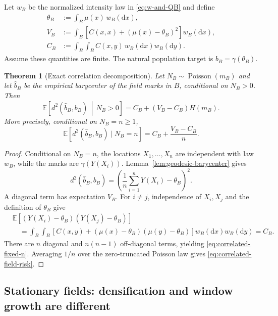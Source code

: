 \documentclass[11pt,a4paper]{article}
\newtheorem{theorem}{Theorem}[section]
\theoremstyle{remark}
\newcommand{\EE}{\mathbb E}
\begin{document}
Let \(w_B\) be the normalized intensity law in \eqref{eq:w-and-QB} and define
\begin{align}
\label{eq:theta-field}
 \theta_B&:=\int_B\mu(x)\,w_B(\mathrm dx),\\
\label{eq:VB}
 V_B&:=\int_B\left[C(x,x)+(\mu(x)-\theta_B)^2\right]w_B(\mathrm dx),\\
\label{eq:CB}
 C_B&:=\int_B\int_B C(x,y)\,w_B(\mathrm dx)w_B(\mathrm dy).
\end{align}
Assume these quantities are finite.  The natural population target is \(b_B=\gamma(\theta_B)\).

\begin{theorem}[Exact correlation decomposition]
\label{thm:correlated-field}
Let \(N_B\sim\operatorname{Poisson}(m_B)\) and let \(\widehat b_B\) be the empirical barycenter of the field marks in \(B\), conditional on \(N_B>0\).  Then
\begin{equation}
\label{eq:correlated-field-risk}
 \EE\!\left[d^2(\widehat b_B,b_B)\,\middle|\,N_B>0\right]
 =C_B+(V_B-C_B)H(m_B).
\end{equation}
More precisely, conditional on \(N_B=n\ge1\),
\begin{equation}
\label{eq:correlated-fixed-n}
 \EE[d^2(\widehat b_B,b_B)\mid N_B=n]
 =C_B+\frac{V_B-C_B}{n}.
\end{equation}
\end{theorem}

\begin{proof}
Conditional on \(N_B=n\), the locations \(X_1,\ldots,X_n\) are independent with law \(w_B\), while the marks are \(\gamma(Y(X_i))\).  Lemma~\ref{lem:geodesic-barycenter} gives
\[
 d^2(\widehat b_B,b_B)
 =\left(\frac1n\sum_{i=1}^nY(X_i)-\theta_B\right)^2.
\]
A diagonal term has expectation \(V_B\).  For \(i\ne j\), independence of \(X_i,X_j\) and the definition of \(\theta_B\) give
\begin{align*}
 &\EE[(Y(X_i)-\theta_B)(Y(X_j)-\theta_B)]\\
 &\quad=\int_B\int_B\left[C(x,y)+(\mu(x)-\theta_B)(\mu(y)-\theta_B)\right]
 w_B(\mathrm dx)w_B(\mathrm dy)=C_B.
\end{align*}
There are \(n\) diagonal and \(n(n-1)\) off-diagonal terms, yielding \eqref{eq:correlated-fixed-n}.  Averaging \(1/n\) over the zero-truncated Poisson law gives \eqref{eq:correlated-field-risk}.
\end{proof}

\subsection{Stationary fields: densification and window growth are different}
\end{document}
